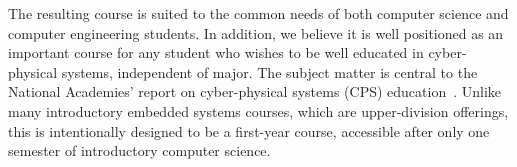 The resulting course is  suited to the common needs of
both computer science and computer engineering students.
In addition, we believe it is well positioned as an important course for
any student who wishes to be well educated in cyber-physical systems,
independent of major.
The subject matter is central to the National Academies' report on
cyber-physical systems (CPS) education~\cite{nasem16}.
Unlike many introductory embedded systems courses, which are upper-division
offerings, this is intentionally
designed to be a first-year course, accessible after only
one semester of introductory computer science.
